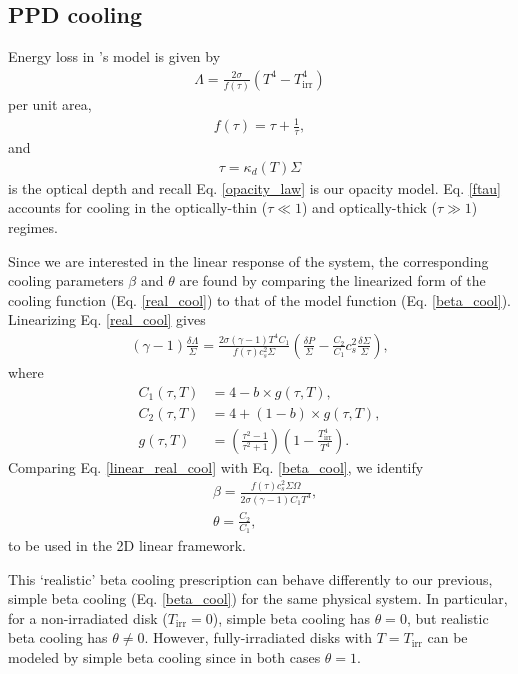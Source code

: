 \subsection{PPD cooling}
Energy loss in \citeauthor{rafikov15}'s model is given by 
\begin{align}\label{real_cool}
  \Lambda = \frac{2\sigma}{f(\tau)}\left(T^4 - T_\mathrm{irr}^4\right)
\end{align}
per unit area, 
\begin{align}
  f(\tau) = \tau + \frac{1}{\tau}, \label{ftau} 
\end{align}
and
\begin{align}
  \tau = \kappa_d(T)\Sigma
\end{align}
is the optical depth and recall Eq. \ref{opacity_law} 
is our opacity model. Eq. \ref{ftau} accounts for cooling in the
optically-thin ($\tau\ll 1$) and optically-thick ($\tau\gg1$)
regimes. 

Since we are interested in the linear response of the system, the
corresponding cooling parameters $\beta$ and $\theta$ are found by
comparing the linearized form of the cooling function
(Eq. \ref{real_cool}) to that of the model function
(Eq. \ref{beta_cool}).  
Linearizing Eq. \ref{real_cool} gives   
\begin{align}\label{linear_real_cool}
  (\gamma-1)\frac{\delta\Lambda}{\Sigma} = \frac{2\sigma(\gamma-1)
    T^4C_1}{f(\tau)c_{s}^2\Sigma}\left(\frac{\delta P}{\Sigma} -
  \frac{C_2}{C_1}c_{s}^2\frac{\delta\Sigma}{\Sigma}\right), 
\end{align}
where
\begin{align}
C_1(\tau, T) &= 4 - b\times g(\tau, T),\\ 
C_2(\tau, T) &= 4 + (1-b)\times g(\tau, T),\\ 
  g(\tau, T) &= \left( \frac{\tau^2-1}{\tau^2+1}\right)\left(1 -
  \frac{T_\mathrm{irr}^4}{T^4}\right). 
\end{align}
Comparing Eq. \ref{linear_real_cool} with Eq. \ref{beta_cool}, we identify
\begin{align}
  &\beta = \frac{f(\tau)c_s^2\Sigma\Omega}{2\sigma(\gamma-1)C_1T^4},\\
  &\theta = \frac{C_2}{C_1}, 
\end{align}
to be used in the 2D linear framework. 

This `realistic' beta cooling prescription can behave differently to 
our previous, simple beta cooling (Eq. \ref{beta_cool}) for the same
physical system. In particular, for a non-irradiated disk
($T_\mathrm{irr}=0$), simple beta 
cooling has  $\theta=0$, but realistic beta cooling has $\theta\neq
0$. However, fully-irradiated disks with $T=T_\mathrm{irr}$ can be
modeled by simple beta cooling since in both cases $\theta=1$.  


